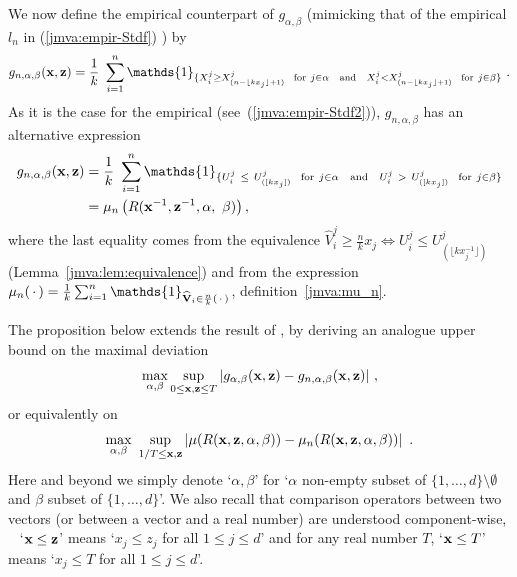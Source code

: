 We now define the empirical counterpart of $g_{\alpha, \beta}$
(mimicking that of the empirical \stdf $l_n$ in (\ref{jmva:empir-Stdf}) ) by
\begin{align}
\label{jmva:def:gn}
g_{n, \alpha, \beta}(\mb x, \mb z) = \frac{1}{k}~\sum_{i=1}^{n}
\mathds{1}_{\{ X_i^j \ge X^j_{(n-\lfloor kx_j \rfloor+1)}  ~~\text{for}~
  j \in \alpha \text{~~~and~~~} X_i^j < X^j_{(n-\lfloor
    kx_j\rfloor+1)} ~~\text{for}~ j \in\beta \}}~.
\end{align}
As it is the case for the empirical \stdf (see~(\ref{jmva:empir-Stdf2})), $g_{n,\alpha,\beta}$ has an alternative expression
\begin{align}\label{jmva:eq:gn2}
  \nonumber g_{n, \alpha, \beta}(\mb x, \mb z)&=\frac{1}{k} ~\sum_{i=1}^{n}
  \mathds{1}_{\{ U_i^j ~\le~ U^j_{([kx_j])} ~~\text{for}~ j \in \alpha
    \text{~~~and~~~} U_i^j ~>~U^j_{([kx_j])} ~~\text{for}~ j \in\beta \}}\\
  &= \mu_n \left( R(\mb x^{-1}, \mb z^{-1}, \alpha,~\beta)\right),
\end{align}
where the last equality comes from the equivalence $\widehat V_i^j \ge \frac{n}{k} x_j \Leftrightarrow U_i^j \le U_{(\lfloor kx_j^{-1}\rfloor)}^j$ (Lemma~\ref{jmva:lem:equivalence}) and from the expression $\mu_n(\point) = \frac{1}{k}\sum_{i=1}^n \mathds{1}_{\mb{\widehat{V}}_i \in \frac{n}{k} (\point)}$, definition~\eqref{jmva:mu_n}.

\noindent
The proposition below extends the result of \cite{COLT15}, by deriving an analogue upper bound on the maximal deviation 
$$%
\max_{\alpha,\beta}\sup_{ 0 \le \mb x, \mb z \le T} |g_{\alpha, \beta}(\mb x, \mb z) - g_{n, \alpha, \beta}(\mb x, \mb z)|~,$$ 
or equivalently on
$$\max_{\alpha, \beta}~ \sup_{1/T \le \mathbf x, \mathbf z } \left|\mu ( R(\mathbf x, \mathbf z, \alpha, \beta)) - \mu_n (R(\mathbf x, \mathbf z, \alpha, \beta) )\right| ~.$$
Here and beyond %
we simply denote `$\alpha,\beta$'  for `$\alpha$ non-empty subset of $\{1,\ldots,d\}\setminus \emptyset$ and $\beta$ subset of
$\{1,\ldots,d\}$'. We also recall that comparison operators between two vectors (or
between a vector and a real number) are understood component-wise, \ie~ `$\mathbf x \le \mathbf z$' means `$x_j \le z_j$ for all $1\le j\le d$' and  for any real number $T$,  `$\mathbf x\le T$' means `$x_j \le T$ for all $1\le j\le d$'. 

